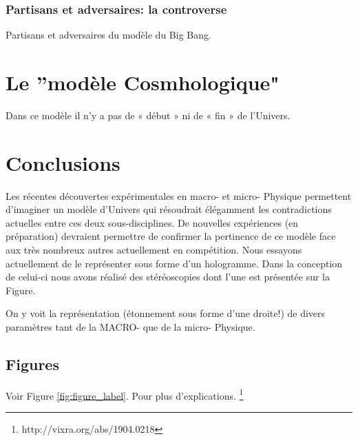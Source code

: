 \documentclass[a4paper,9pt]{article}
\begin{document}
\subsubsection{Partisans et adversaires: la controverse}

Partisans et adversaires du modèle du Big Bang.

\section{Le ”modèle Cosmhologique"}
\label{sec:headings}

Dans ce modèle il n'y a pas de « début » ni de « fin » de l'Univers.


\section{Conclusions}
\label{sec:headings}

Les récentes découvertes expérimentales en macro- et micro- Physique permettent d'imaginer un modèle d'Univers qui résoudrait élégamment les contradictions actuelles entre ces deux sous-disciplines. De nouvelles expériences (en préparation) devraient permettre de confirmer la pertinence de ce modèle face aux très nombreux autres actuellement en compétition. Nous essayons actuellement de le représenter sous forme d'un hologramme. Dans la conception de celui-ci nous avons réalisé des stéréoscopies dont l'une est présentée sur la Figure.

On y voit la représentation (étonnement sous forme d'une droite!) de divers paramètres tant de la MACRO- que de la micro- Physique.


\subsection{Figures}

Voir Figure \ref{fig:figure_label}. Pour plus d'explications. \footnote{http://vixra.org/abs/1904.0218}
 
\end{document}
